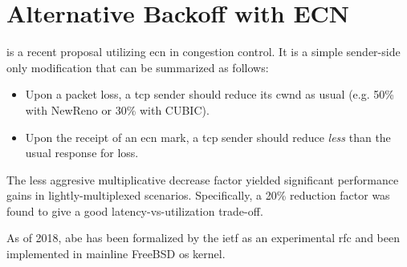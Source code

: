




\section{Alternative Backoff with ECN}

 \cite{abe} is a recent proposal utilizing \gls{ecn} in congestion control. It is a simple sender-side only modification that can be summarized as follows:

\begin{itemize}
    \item Upon a packet loss, a \gls{tcp} sender should reduce its \gls{cwnd} as usual (e.g. 50\% with NewReno or 30\% with CUBIC).
    \item Upon the receipt of an \gls{ecn} mark, a \gls{tcp} sender should reduce \textit{less} than the usual response for loss.
\end{itemize}

The less aggresive multiplicative decrease factor yielded  significant performance gains in lightly-multiplexed scenarios. Specifically, a 20\% reduction factor was found to give a good latency-vs-utilization trade-off.

As of 2018, \gls{abe} has been formalized by the \gls{ietf} as an experimental \gls{rfc} \cite{rfc8511} and been implemented in mainline FreeBSD \gls{os} kernel.


